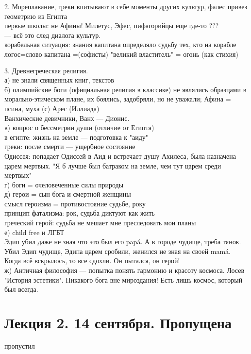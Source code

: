 \documentclass[a4paper,12pt]{article}
\begin{document}
2. Мореплавание, греки впитывают в себе моменты других культур, фалес привез геометрию из Египта\\
первые школы: не Афины! Милетус, Эфес, пифагорийцы еще где-то ??? \\
--- всё это след диалога культур.\\
корабельная ситуация: знания капитана определяло судьбу тех, кто на корабле\\
логос=слово капитана =(софисты) "великий властитель" = огонь (как стихия)

3. Древнегреческая религия.\\
а) не знали священных книг, текстов\\
б) олимпийские боги (официальная религия в классике) не являлись образцами в морально-этическом плане, их боялись, задобряли, но не уважали; Афина = псина, муха (с) Арес (Иллиада)\\
Ванхические девичники, Ванх --- Дионис.\\
в) вопрос о бессметрии души (отличие от Египта)\\
в египте: жизнь на земле --- подготовка к "аиду"\\
греки: после смерти --- ущербное состояние\\
Одиссея: попадает Одиссей в Аид и встречает душу Ахилеса, была назначена царем мертвых. "Я б лучше был батраком на земле, чем тут царем среди мертвых"\\
г) боги = очеловеченные силы природы\\
д) герои = сын бога и смертной женщины \\
смысл героизма = противостояние судьбе, року\\
принцип фатализма: рок, судьба диктуют как жить\\
греческий герой: судьба не мешает мне преследовать мои планы\\
е) child free и ЛГБТ\\
Эдип убил даже не зная что это был его pap\'a. А в городе чудище, треба тянок. Убил Эдип чудище, Эдипа царем сробили, женился не зная на своей mam\'a. Когда всё вскрылось, то все сдохли. Он пытался, он герой!\\
ж) Античная философия --- попытка понять гармонию и красоту космоса. Лосев "История эстетики". Никакого бога вне мироздания! Есть лишь космос, который был всегда.
\section{Лекция 2. 14 сентября. Пропущена} пропустил
\end{document}
